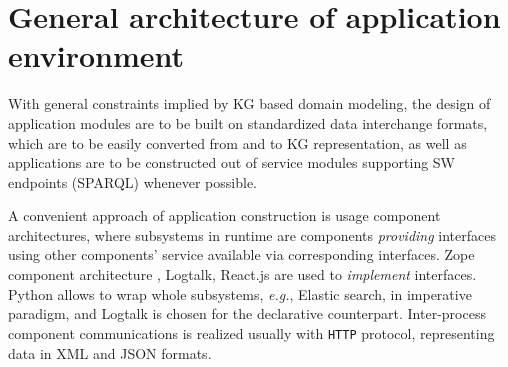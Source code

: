 \documentclass[
]{ceurart}
\begin{document}

\section{General architecture of application environment}
\label{sec:architecture}

With general constraints implied by KG based domain modeling, the design of application modules are to be built on standardized data interchange formats, which are to be easily converted from and to KG representation, as well as applications are to be constructed out of service modules supporting SW endpoints (SPARQL) whenever possible.

A convenient approach of application construction is usage component architectures, where subsystems in runtime are components \emph{providing} interfaces using other components' service available via corresponding interfaces. Zope component architecture \cite{zca}, Logtalk, React.js are used to \emph{implement} interfaces.  Python allows to wrap whole subsystems, \emph{e.g.}, Elastic search, in imperative paradigm, and Logtalk is chosen for the declarative counterpart. Inter-process component communications is realized usually with \texttt{HTTP} protocol, representing data in XML and JSON formats.
\end{document}
